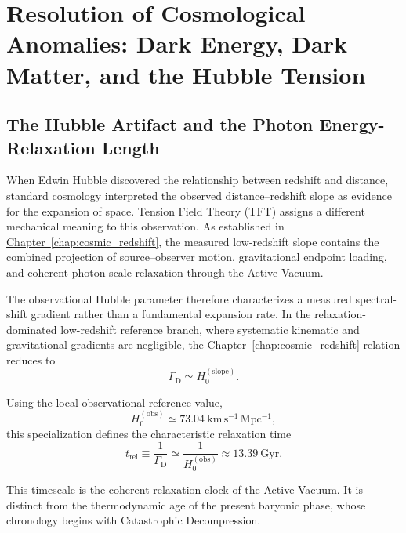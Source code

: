 \chapter{Resolution of Cosmological Anomalies: Dark Energy, Dark Matter, and the Hubble Tension}
\label{chap:cosmological_anomalies}


\section{The Hubble Artifact and the Photon Energy-Relaxation Length}
\label{sec:hubble_artifact}

When Edwin Hubble discovered the relationship between redshift and distance, standard cosmology interpreted the observed distance--redshift slope as evidence for the expansion of space. Tension Field Theory (TFT) assigns a different mechanical meaning to this observation. As established in \hyperref[chap:cosmic_redshift]{Chapter~\ref*{chap:cosmic_redshift}}, the measured low-redshift slope contains the combined projection of source--observer motion, gravitational endpoint loading, and coherent photon scale relaxation through the Active Vacuum.

The observational Hubble parameter therefore characterizes a measured spectral-shift gradient rather than a fundamental expansion rate. In the relaxation-dominated low-redshift reference branch, where systematic kinematic and gravitational gradients are negligible, the Chapter~\ref*{chap:cosmic_redshift} relation reduces to
\begin{equation}
    \Gamma_{\mathrm D}
    \simeq
    H_0^{(\mathrm{slope})}.
\end{equation}

Using the local observational reference value,
\begin{equation}
    H_0^{(\mathrm{obs})}
    \simeq
    73.04\ \mathrm{km\,s^{-1}\,Mpc^{-1}},
\end{equation}
this specialization defines the characteristic relaxation time
\begin{equation}
    t_{\mathrm{rel}}
    \equiv
    \frac{1}{\Gamma_{\mathrm D}}
    \simeq
    \frac{1}{H_0^{(\mathrm{obs})}}
    \approx
    13.39\ \mathrm{Gyr}.
\end{equation}

This timescale is the coherent-relaxation clock of the Active Vacuum. It is distinct from the thermodynamic age of the present baryonic phase, whose chronology begins with Catastrophic Decompression.

